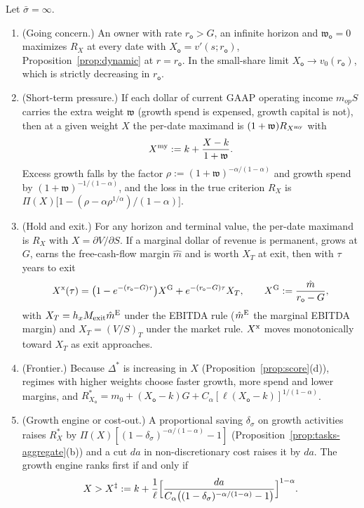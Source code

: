 \begin{proposition}\label{prop:reg-weight}
Let $\bar\sigma=\infty$.
\begin{enumerate}
\item[(a)] (Going concern.) An owner with rate $r_{\mathsf o}>G$, an infinite horizon and $\mathfrak w_{\mathsf o}=0$ maximizes $R_X$ at every date with $X_{\mathsf o}=v'(s;r_{\mathsf o})$, Proposition~\ref{prop:dynamic} at $r=r_{\mathsf o}$. In the small-share limit $X_{\mathsf o}\to v_0(r_{\mathsf o})$, which is strictly decreasing in $r_{\mathsf o}$.
\item[(b)] (Short-term pressure.) If each dollar of current GAAP operating income $m_{op}S$ carries the extra weight $\mathfrak w$ (growth spend is expensed, growth capital is not), then at a given weight $X$ the per-date maximand is $(1+\mathfrak w)R_{X^{\rm my}}$ with
\begin{equation}\label{eq:reg-Xmy}
X^{\rm my}:=k+\frac{X-k}{1+\mathfrak w}.
\end{equation}
Excess growth falls by the factor $\rho:=(1+\mathfrak w)^{-\alpha/(1-\alpha)}$ and growth spend by $(1+\mathfrak w)^{-1/(1-\alpha)}$, and the loss in the true criterion $R_X$ is $\Pi(X)\bigl[1-(\rho-\alpha\rho^{1/\alpha})/(1-\alpha)\bigr]$.
\item[(c)] (Hold and exit.) For any horizon and terminal value, the per-date maximand is $R_X$ with $X=\partial V/\partial S$. If a marginal dollar of revenue is permanent, grows at $G$, earns the free-cash-flow margin $\hat m$ and is worth $X_T$ at exit, then with $\tau$ years to exit
\begin{equation}\label{eq:reg-Xexit}
X^{\rm x}(\tau)=\bigl(1-e^{-(r_{\mathsf o}-G)\tau}\bigr)X^{\rm G}+e^{-(r_{\mathsf o}-G)\tau}X_T,\qquad X^{\rm G}:=\frac{\hat m}{r_{\mathsf o}-G},
\end{equation}
with $X_T=h_xM_{\rm exit}\hat m^{\rm E}$ under the EBITDA rule ($\hat m^{\rm E}$ the marginal EBITDA margin) and $X_T=(V/S)_T$ under the market rule. $X^{\rm x}$ moves monotonically toward $X_T$ as exit approaches.
\item[(d)] (Frontier.) Because $\Delta^*$ is increasing in $X$ (Proposition~\ref{prop:score}(d)), regimes with higher weights choose faster growth, more spend and lower margins, and $R^*_{X_{\mathsf o}}=m_0+(X_{\mathsf o}-k)G+C_\alpha[\ell(X_{\mathsf o}-k)]^{1/(1-\alpha)}$.
\item[(e)] (Growth engine or cost-out.) A proportional saving $\delta_\sigma$ on growth activities raises $R^*_X$ by $\Pi(X)[(1-\delta_\sigma)^{-\alpha/(1-\alpha)}-1]$ (Proposition~\ref{prop:tasks-aggregate}(b)) and a cut $da$ in non-discretionary cost raises it by $da$. The growth engine ranks first if and only if
\begin{equation}\label{eq:reg-Xdag}
X>X^\ddagger:=k+\frac1\ell\Bigl[\frac{da}{C_\alpha\bigl((1-\delta_\sigma)^{-\alpha/(1-\alpha)}-1\bigr)}\Bigr]^{1-\alpha}.
\end{equation}
\end{enumerate}
\end{proposition}

